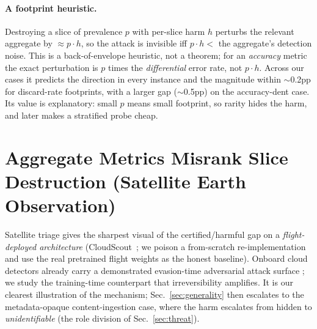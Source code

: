 \documentclass[conference]{IEEEtran}
\newif\ifgovernance \ifdefined\govbuild\governancetrue\else\governancefalse\fi
\begin{document}
\ifgovernance
\paragraph{A differential-privacy reading.} The Manski bound \eqref{eq:manski} says the retained-data distribution is
\emph{exactly invariant} to the harm $\theta$: every value in the identified set is consistent with identical
survivors. Borrowing the vocabulary of differential privacy, this is structurally analogous to the $\varepsilon\to0$
limit: the harm is \emph{perfectly indistinguishable} to any audit measurable in the surviving data. The
analogy is structural, not formal---the censoring is deterministic, so there is no randomized mechanism and no
privacy-loss distribution to compose. Differential
privacy deploys such indistinguishability to \emph{protect} an individual from identification; irreversible
gatekeeping turns the same structure to \emph{hide a harm} from identification---differential privacy with the
valence inverted. The external-reference probe defeats it not by cleverer analysis of the
survivors (which the exact invariance forbids) but by opening a channel the guarantee does not cover---direct
access to $S$.
\fi

\paragraph{A footprint heuristic.} Destroying a slice of prevalence $p$ with per-slice harm $h$ perturbs the
relevant aggregate by $\approx p\cdot h$, so the attack is invisible iff $p\cdot h <$ the aggregate's
detection noise. This is a back-of-envelope heuristic, not a theorem; for an \emph{accuracy} metric the
exact perturbation is $p$ times the \emph{differential} error rate, not $p\cdot h$. Across our cases it
predicts the direction in every instance and the magnitude within $\sim$0.2pp for discard-rate footprints,
with a larger gap ($\sim$0.5pp) on the accuracy-dent case. Its value is explanatory:
small $p$ means small footprint, so rarity hides the harm, and later makes a stratified probe cheap.

\section{Aggregate Metrics Misrank Slice Destruction (Satellite Earth Observation)}\label{sec:dashboard}
Satellite triage gives the sharpest visual of the certified/harmful gap on a \emph{flight-deployed
architecture} (CloudScout~\cite{giuffrida2020}; we poison a from-scratch re-implementation and use the real pretrained flight
weights as the honest baseline). Onboard cloud detectors already carry a demonstrated evasion-time adversarial
attack surface \cite{du2021}; we study the training-time counterpart that irreversibility amplifies. It is our clearest illustration of the mechanism; Sec.~\ref{sec:generality}
then escalates to the metadata-opaque content-ingestion case, where the harm escalates from hidden to
\emph{unidentifiable} (the role division of Sec.~\ref{sec:threat}).
\end{document}

